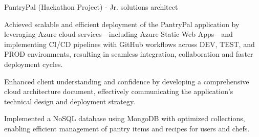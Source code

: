 \begin{cventries}
\cvproject
{PantryPal (Hackathon Project) - Jr. solutions architect} %
{} %
{}
{}
{
  \begin{cvitems} %
    \item {Achieved scalable and efficient deployment of the PantryPal application by leveraging Azure cloud services—including Azure Static Web Apps—and implementing CI/CD pipelines with GitHub workflows across DEV, TEST, and PROD environments, resulting in seamless integration, collaboration and faster deployment cycles.}
    \item {Enhanced client understanding and confidence by developing a comprehensive cloud architecture document, effectively communicating the application's technical design and deployment strategy.}
    \item {Implemented a NoSQL database using MongoDB with optimized collections, enabling efficient management of pantry items and recipes for users and chefs.}
  \end{cvitems}
}




\end{cventries}
